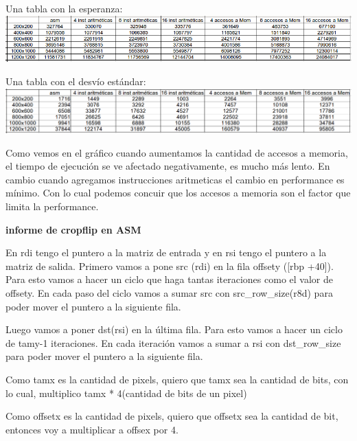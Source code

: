\documentclass{article}
\begin{document}
Una tabla con la esperanza: \newline
\includegraphics[width=\textwidth,height=\textheight,keepaspectratio
]{tablaMenVsArit.png}
\begin {flushleft}
\end{flushleft}

Una tabla con el desvío estándar:\newline
\includegraphics[width=\textwidth,height=\textheight,keepaspectratio
]{tablaVarianzaMenvscpu.png}
\begin {flushleft}
\end{flushleft}
Como vemos en el gráfico cuando aumentamos la cantidad de accesos a memoria, el tiempo de ejecución se ve afectado negativamente, es mucho más lento.
En cambio cuando agregamos instrucciones aritmeticas el cambio en performance es mínimo.
Con lo cual podemos concuir que los accesos a memoria son el factor que limita la performance.

\textbf{informe de cropflip en ASM}\newline

En rdi tengo el puntero a la matriz de entrada y en rsi tengo el puntero a la matriz de salida.\newline
Primero vamos a pone src (rdi) en la fila offsety ([rbp +40]). \newline
Para esto vamos a hacer un ciclo que haga tantas iteraciones como el valor de offsety.\newline
En cada paso del ciclo vamos a sumar src con src\_row\_size(r8d) 
para poder mover el puntero a la siguiente fila.

Luego vamos a poner dst(rsi) en la última fila.
Para esto vamos a hacer un ciclo de tamy-1 iteraciones.
En cada iteración vamos a sumar a rsi con dst\_row\_size para poder mover el puntero a la siguiente fila.

Como tamx es la cantidad de pixels, quiero que tamx sea la cantidad de bits,  con lo cual, multiplico tamx * 4(cantidad de bits de un pixel) 

Como offsetx es la cantidad de pixels, quiero que offsetx sea la cantidad de bit, entonces voy a multiplicar a offsex por 4.
\end{document}
